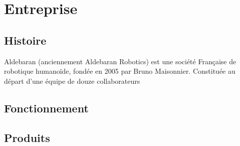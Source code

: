 \chapter*{Entreprise}
\label{Entreprise}
\thispagestyle{fancy}

\section{Histoire}
\label{Entreprise: histoire}
Aldebaran (anciennement Aldebaran Robotics) est une société Française de robotique humanoïde, fondée en 2005 par Bruno Maisonnier. 
Constituée au départ d'une équipe de douze collaborateurs

\section{Fonctionnement}

\section{Produits}
